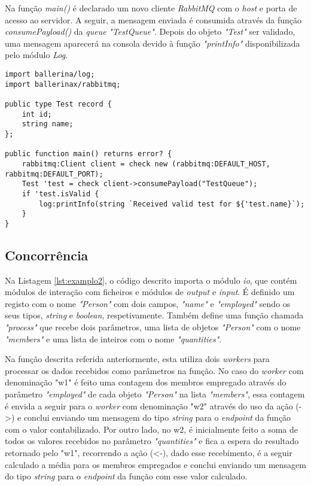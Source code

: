 Na função \textit{main()} é declarado um novo cliente \textit{RabbitMQ} com o \textit{host} e porta de acesso ao servidor. A seguir, a mensagem enviada é consumida através da função \textit{consumePayload()} da \textit{queue} \textit{"TestQueue"}. Depois do objeto \textit{"Test"} ser validado, uma mensagem aparecerá na consola devido à função \textit{"printInfo"} disponibilizada pelo módulo \textit{Log}.

\begin{minipage}{0.9\linewidth}
\begin{lstlisting}[language=ballerina, caption=Exemplo da consumição de uma mensagem do servidor. , label=lst:examplo7]
import ballerina/log;
import ballerinax/rabbitmq;

public type Test record {
    int id;
    string name;
};

public function main() returns error? {
    rabbitmq:Client client = check new (rabbitmq:DEFAULT_HOST, rabbitmq:DEFAULT_PORT);
    Test 'test = check client->consumePayload("TestQueue");
    if 'test.isValid {
        log:printInfo(string `Received valid test for ${'test.name}`);
    }
}
\end{lstlisting}
\end{minipage}

\subsection{Concorrência}

Na Listagem \ref{lst:examplo2}, o código descrito importa o módulo \textit{io}, que contém módulos de interação com ficheiros e módulos de \textit{output} e \textit{input}. É definido um registo com o nome \textit{"Person"} com dois campos, \textit{"name"} e \textit{"employed"} sendo os seus tipos, \textit{string} e \textit{boolean}, respetivamente. Também define uma função chamada \textit{"process"} que recebe dois parâmetros, uma lista de objetos \textit{"Person"} com o nome \textit{"members"} e uma lista de inteiros com o nome \textit{"quantities"}.

Na função descrita referida anteriormente, esta utiliza dois \textit{workers} para processar os dados recebidos como parâmetros na função. No caso do \textit{worker} com denominação "w1" é feito uma contagem dos membros empregado através do parâmetro \textit{"employed"} de cada objeto \textit{"Person"} na lista \textit{"members"}, essa contagem é envida a seguir para o \textit{worker} com denominação "w2" através do uso da ação (->) e conclui enviando um mensagem do tipo \textit{string} para o \textit{endpoint} da função com o valor contabilizado. Por outro lado, no w2, é inicialmente feito a soma de todos os valores recebidos no parâmetro \textit{"quantities"} e fica a espera do resultado retornado pelo "w1", recorrendo a ação (<-), dado esse recebimento, é a seguir calculado a média para os membros empregados e conclui enviando um mensagem do tipo \textit{string} para o \textit{endpoint} da função com esse valor calculado.

